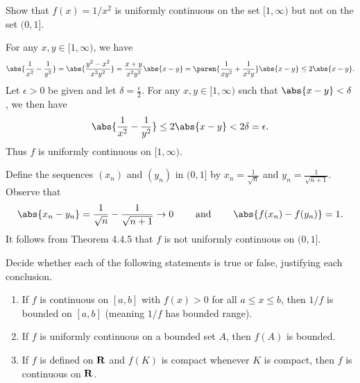 \documentclass{lew98_solutions}
\begin{document}
\begin{exercise}
\label{ex:4.4.3}
    Show that \( f(x) = 1/x^2 \) is uniformly continuous on the set \( [1, \infty) \) but not on the set \( (0, 1] \).
\end{exercise}

\begin{solution}
    For any \( x, y \in [1, \infty) \), we have
    \[
        \abs{\frac{1}{x^2} - \frac{1}{y^2}} = \abs{\frac{y^2 - x^2}{x^2 y^2}} = \frac{x + y}{x^2 y^2} \abs{x - y} = \paren{ \frac{1}{x y^2} + \frac{1}{x^2 y} } \abs{x - y} \leq 2 \abs{x - y}.
    \]
    Let \( \epsilon > 0 \) be given and let \( \delta = \tfrac{\epsilon}{2} \). For any \( x, y \in [1, \infty) \) such that \( \abs{x - y} < \delta \), we then have
    \[
        \abs{\frac{1}{x^2} - \frac{1}{y^2}} \leq 2 \abs{x - y} < 2 \delta = \epsilon.
    \]
    Thus \( f \) is uniformly continuous on \( [1, \infty) \).

    Define the sequences \( (x_n) \) and \( (y_n) \) in \( (0, 1] \) by \( x_n = \tfrac{1}{\sqrt{n}} \) and \( y_n = \tfrac{1}{\sqrt{n+1}} \). Observe that
    \[
        \abs{x_n - y_n} = \frac{1}{\sqrt{n}} - \frac{1}{\sqrt{n+1}} \to 0 \hspaceand \abs{f(x_n) - f(y_n)} = 1.
    \]
    It follows from Theorem 4.4.5 that \( f \) is not uniformly continuous on \( (0, 1] \).
\end{solution}

\begin{exercise}
\label{ex:4.4.4}
    Decide whether each of the following statements is true or false, justifying each conclusion.
    \begin{enumerate}
        \item If \( f \) is continuous on \( [a, b] \) with \( f(x) > 0 \) for all \( a \leq x \leq b \), then \( 1/f \) is bounded on \( [a, b] \) (meaning \( 1/f \) has bounded range).

        \item If \( f \) is uniformly continuous on a bounded set \( A \), then \( f(A) \) is bounded.

        \item If \( f \) is defined on \( \mathbf{R} \) and \( f(K) \) is compact whenever \( K \) is compact, then \( f \) is continuous on \( \mathbf{R} \).
    \end{enumerate}
\end{exercise}
\end{document}
